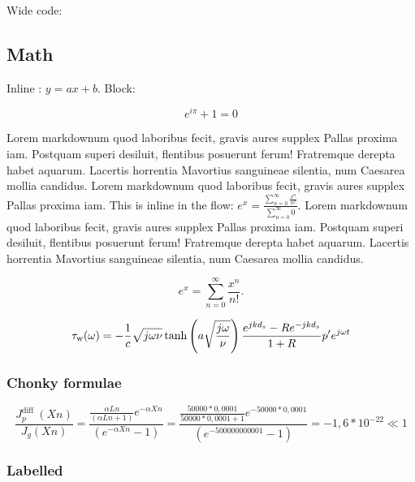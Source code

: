 \documentclass[
]{tufte-pandoc}
\newenvironment{Shaded}{}{}
\newcommand{\AttributeTok}[1]{\textcolor[rgb]{0.49,0.56,0.16}{#1}}
\newcommand{\ExtensionTok}[1]{#1}
\newcommand{\NormalTok}[1]{#1}
\newcommand{\OperatorTok}[1]{\textcolor[rgb]{0.40,0.40,0.40}{#1}}
\newcommand{\StringTok}[1]{\textcolor[rgb]{0.25,0.44,0.63}{#1}}
\newcommand{\VariableTok}[1]{\textcolor[rgb]{0.10,0.09,0.49}{#1}}
\begin{document}
Wide code:

\begin{Shaded}
\end{Shaded}

\hypertarget{math}{%
\subsection{Math}\label{math}}

Inline : \(y = ax + b\). Block:

\[
e^{i\pi}+1 = 0
\]

Lorem markdownum quod laboribus fecit, gravis aures supplex Pallas
proxima iam. Postquam superi desiluit, flentibus posuerunt ferum!
Fratremque derepta habet aquarum. Lacertis horrentia Mavortius
sanguineae silentia, num Caesarea mollia candidus. Lorem markdownum quod
laboribus fecit, gravis aures supplex Pallas proxima iam. This is inline
in the flow:
\(e^x = \frac{\sum_{n = 0}^{\infty} \frac{x^n}{n!}}{\sum_{n = 0}^{\infty}0}\).
Lorem markdownum quod laboribus fecit, gravis aures supplex Pallas
proxima iam. Postquam superi desiluit, flentibus posuerunt ferum!
Fratremque derepta habet aquarum. Lacertis horrentia Mavortius
sanguineae silentia, num Caesarea mollia candidus.

\[
e^x = \sum_{n = 0}^{\infty} \frac{x^n}{n!}.
\]

\[
\tau_\text w(\omega)=-\frac{1}{c} \sqrt{j \omega \nu} \tanh \left(a \sqrt{\frac{j \omega}{\nu}}\right) \frac{e^{j k d_s}-R e^{-j k d_s}}{1+R} p^{\prime} e^{j \omega t}
\]

\hypertarget{chonky-formulae}{%
\subsubsection{Chonky formulae}\label{chonky-formulae}}

\[
\frac{J_{p}^{\text {diff }}(X n)}{J_{g}(X n)}=\frac{\frac{\alpha L n}{(\alpha L n+1)} e^{-\alpha X n}}{\left(e^{-\alpha X n}-1\right)}=\frac{\frac{50000 * 0,0001}{50000 * 0,0001+1} e^{-50000 * 0,0001}}{\left(e^{-500000000001}-1\right)}=-1,6 * 10^{-22} \ll 1
\]

\hypertarget{labelled}{%
\subsubsection{Labelled}\label{labelled}}
\end{document}
